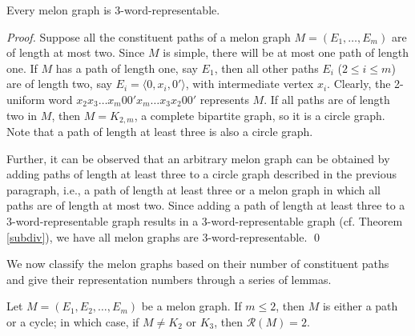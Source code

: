 \documentclass{llncs}
\begin{document}
\begin{theorem}\label{3-word-fg}
	Every melon graph is 3-word-representable. 
\end{theorem}

\begin{proof} 
	Suppose all the constituent paths of a melon graph $M = (E_1, \ldots, E_m)$ are of length at most two. Since $M$ is simple, there will be at most one path of length one. If $M$ has a path of length one, say $E_1$, then all other paths $E_i$ ($2 \le i \le m$) are of length two, say $E_i = \langle 0, x_i, 0' \rangle $, with intermediate vertex $x_i$. Clearly, the 2-uniform word $x_2 x_3 \ldots x_m 0 0' x_m \ldots x_3 x_2 0 0'$ represents $M$. If all paths are of length two in $M$, then $M = K_{2,m}$, a complete bipartite graph, so it is a circle graph. Note that a path of length at least three is also a circle graph.
	
	Further, it can be observed that an arbitrary melon graph can be obtained by adding paths of length at least three to a circle graph described in the previous paragraph, i.e., a path of length at least three or a melon graph in which all paths are of length at most two. Since adding a path of length at least three to a 3-word-representable graph results in a 3-word-representable graph (cf. Theorem \ref{subdiv}), we have all melon graphs are 3-word-representable. \qed  
\end{proof}	

We now classify the melon graphs based on their number of constituent paths and give their representation numbers through a series of lemmas.

Let $M = (E_1, E_2, \ldots, E_m)$ be a melon graph. If $m \le 2$, then $M$ is either a path or a cycle; in which case, if $M \ne K_2$ or $K_3$, then $\mathcal{R}(M) = 2$. 
\end{document}
